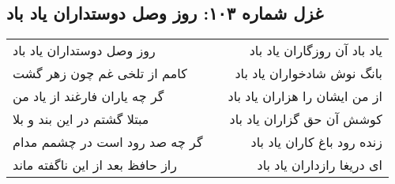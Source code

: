 \begin{center}
\section*{غزل شماره ۱۰۳: روز وصل دوستداران یاد باد}
\label{sec:sh103}
\begin{longtable}{l p{0.5cm} r}
روز وصل دوستداران یاد باد
&&
یاد باد آن روزگاران یاد باد
\\
کامم از تلخی غم چون زهر گشت
&&
بانگ نوش شادخواران یاد باد
\\
گر چه یاران فارغند از یاد من
&&
از من ایشان را هزاران یاد باد
\\
مبتلا گشتم در این بند و بلا
&&
کوشش آن حق گزاران یاد باد
\\
گر چه صد رود است در چشمم مدام
&&
زنده رود باغ کاران یاد باد
\\
راز حافظ بعد از این ناگفته ماند
&&
ای دریغا رازداران یاد باد
\\
\end{longtable}
\end{center}
